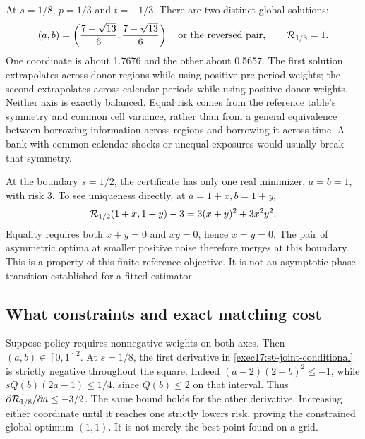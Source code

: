 At $s=1/8$, $p=1/3$ and $t=-1/3$. There are two distinct global solutions:
\begin{equation}
 (a,b)=\left(\frac{7+\sqrt{13}}6,\frac{7-\sqrt{13}}6\right)
 \quad\hbox{or the reversed pair},\qquad
 {\cal R}_{1/8}=1.
 \label{exec17:s6-joint-numeric}
\end{equation}
One coordinate is about 1.7676 and the other about 0.5657. The first
solution extrapolates across donor regions while using positive pre-period
weights; the second extrapolates across calendar periods while using
positive donor weights. Neither axis is exactly balanced. Equal risk comes
from the reference table's symmetry and common cell variance, rather than
from a general equivalence between borrowing information across regions
and borrowing it across time. A bank with common calendar shocks or unequal
exposures would usually break that symmetry.

At the boundary $s=1/2$, the certificate has only one real minimizer,
$a=b=1$, with risk 3. To see uniqueness directly, at $a=1+x,b=1+y$,
\begin{equation}
 {\cal R}_{1/2}(1+x,1+y)-3
   =3(x+y)^2+3x^2y^2.
 \label{exec17:s6-joint-boundary}
\end{equation}
Equality requires both $x+y=0$ and $xy=0$, hence $x=y=0$. The pair of
asymmetric optima at smaller positive noise therefore merges at this
boundary. This is a property of this finite reference objective. It is
not an asymptotic phase transition established for a fitted estimator.

\subsection{What constraints and exact matching cost}

Suppose policy requires nonnegative weights on both axes. Then
$(a,b)\in[0,1]^2$. At $s=1/8$, the first derivative in
\eqref{exec17:s6-joint-conditional} is strictly negative throughout the
square. Indeed $(a-2)(2-b)^2\leq-1$, while
$sQ(b)(2a-1)\leq1/4$, since $Q(b)\leq2$ on that interval. Thus
$\partial{\cal R}_{1/8}/\partial a\leq-3/2$. The same bound holds for
the other derivative. Increasing either coordinate until it reaches one
strictly lowers risk, proving the constrained global optimum $(1,1)$.
It is not merely the best point found on a grid.


